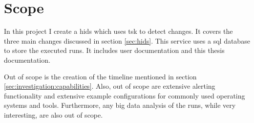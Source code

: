 \section{Scope}

In this project I create a \gls{hids} which uses \gls{tsk} to detect changes. It covers the three main changes discussed in section \ref{sec:hids}. This service uses a \gls{sql} database to store the executed runs. It includes user documentation and this thesis documentation. 

Out of scope is the creation of the timeline mentioned in section \ref{sec:investigation:capabilities}. Also, out of scope are extensive alerting functionality and extensive example configurations for commonly used operating systems and tools. Furthermore, any big data analysis of the runs, while very interesting, are also out of scope.

